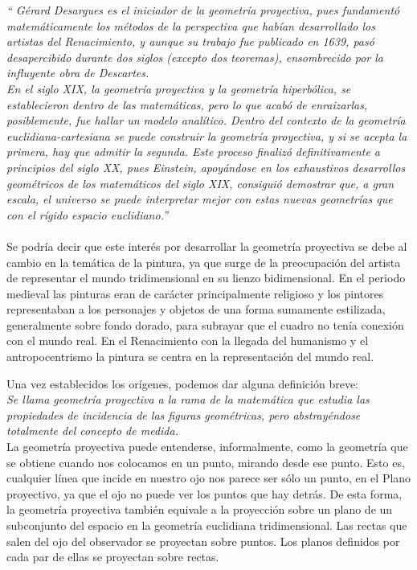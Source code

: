 \documentclass[a4,10pt]{article}
\begin{document}
\emph{“
Gérard Desargues es el iniciador de la geometría proyectiva, pues fundamentó matemáticamente los métodos de la perspectiva que habían desarrollado los artistas del Renacimiento, y aunque su trabajo fue publicado en 1639, pasó desapercibido durante dos siglos (excepto dos teoremas), ensombrecido por la influyente obra de Descartes.\\
En el siglo XIX, la geometría proyectiva y la geometría hiperbólica, se establecieron dentro de las matemáticas, pero lo que acabó de enraizarlas, posiblemente, fue hallar un modelo analítico. Dentro del contexto de la geometría euclidiana-cartesiana se puede construir la geometría proyectiva, y si se acepta la primera, hay que admitir la segunda. Este proceso finalizó definitivamente a principios del siglo XX, pues Einstein, apoyándose en los exhaustivos desarrollos geométricos de los matemáticos del siglo XIX, consiguió demostrar que, a gran escala, el universo se puede interpretar mejor con estas nuevas geometrías que con el rígido espacio euclidiano.”}\\
\\
Se podría decir que este interés por desarrollar la geometría proyectiva se debe al cambio en la temática de la pintura, ya que surge de la preocupación del artista de representar el mundo tridimensional en su lienzo bidimensional. En el periodo medieval las pinturas eran de carácter principalmente religioso y los pintores representaban a los personajes y objetos de una forma sumamente estilizada, generalmente sobre fondo dorado, para subrayar que el cuadro no tenía conexión con el mundo real. En el Renacimiento con la llegada del humanismo y el antropocentrismo la pintura se centra en la representación del mundo real.

Una vez establecidos los orígenes, podemos dar alguna definición breve:\\
\emph{
Se llama geometría proyectiva a la rama de la matemática que estudia las propiedades de incidencia de las figuras geométricas, pero abstrayéndose totalmente del concepto de medida.}\\

La geometría proyectiva puede entenderse, informalmente, como la geometría que se obtiene cuando nos colocamos en un punto, mirando desde ese punto. Esto es, cualquier línea que incide en nuestro ojo nos parece ser sólo un punto, en el Plano proyectivo, ya que el ojo no puede ver los puntos que hay detrás.
De esta forma, la geometría proyectiva también equivale a la proyección sobre un plano de un subconjunto del espacio en la geometría euclidiana tridimensional. Las rectas que salen del ojo del observador se proyectan sobre puntos. Los planos definidos por cada par de ellas se proyectan sobre rectas.
\end{document}
